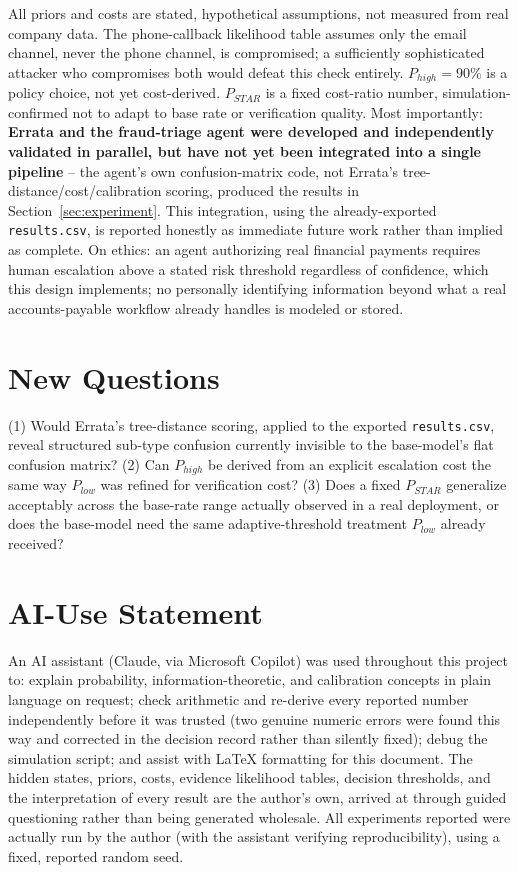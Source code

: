 \documentclass[10pt]{article}
\begin{document}
All priors and costs are stated, hypothetical assumptions, not
measured from real company data. The phone-callback likelihood table
assumes only the email channel, never the phone channel, is
compromised; a sufficiently sophisticated attacker who compromises
both would defeat this check entirely. $P_{high}=90\%$ is a policy
choice, not yet cost-derived. $P_{STAR}$ is a fixed cost-ratio number,
simulation-confirmed not to adapt to base rate or verification
quality. Most importantly: \textbf{Errata and the fraud-triage agent
were developed and independently validated in parallel, but have not
yet been integrated into a single pipeline} -- the agent's own
confusion-matrix code, not Errata's tree-distance/cost/calibration
scoring, produced the results in Section~\ref{sec:experiment}. This
integration, using the already-exported \texttt{results.csv}, is
reported honestly as immediate future work rather than implied as
complete. On ethics: an agent authorizing real financial payments
requires human escalation above a stated risk threshold regardless of
confidence, which this design implements; no personally identifying
information beyond what a real accounts-payable workflow already
handles is modeled or stored.

\section{New Questions}

(1) Would Errata's tree-distance scoring, applied to the exported
\texttt{results.csv}, reveal structured sub-type confusion currently
invisible to the base-model's flat confusion matrix? (2) Can
$P_{high}$ be derived from an explicit escalation cost the same way
$P_{low}$ was refined for verification cost? (3) Does a fixed
$P_{STAR}$ generalize acceptably across the base-rate range actually
observed in a real deployment, or does the base-model need the same
adaptive-threshold treatment $P_{low}$ already received?

\section{AI-Use Statement}

An AI assistant (Claude, via Microsoft Copilot) was used throughout
this project to: explain probability, information-theoretic, and
calibration concepts in plain language on request; check arithmetic
and re-derive every reported number independently before it was
trusted (two genuine numeric errors were found this way and corrected
in the decision record rather than silently fixed); debug the
simulation script; and assist with LaTeX formatting for this document.
The hidden states, priors, costs, evidence likelihood tables, decision
thresholds, and the interpretation of every result are the author's
own, arrived at through guided questioning rather than being generated
wholesale. All experiments reported were actually run by the author
(with the assistant verifying reproducibility), using a fixed,
reported random seed.
\end{document}
